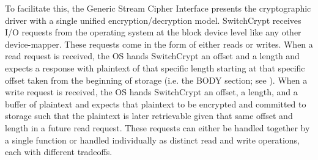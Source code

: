 To facilitate this, the Generic Stream Cipher Interface presents the
cryptographic driver with a single unified encryption/decryption model.
SwitchCrypt receives I/O requests from the operating system at the block device
level like any other device-mapper. These requests come in the form of either
reads or writes. When a read request is received, the OS hands SwitchCrypt an
offset and a length and expects a response with plaintext of that specific
length starting at that specific offset taken from the beginning of storage
(i.e. the BODY section; see ). When a write request is
received, the OS hands SwitchCrypt an offset, a length, and a buffer of
plaintext and expects that plaintext to be encrypted and committed to storage
such that the plaintext is later retrievable given that same offset and length
in a future read request. These requests can either be handled together by a
single function or handled individually as distinct read and write operations,
each with different tradeoffs.

